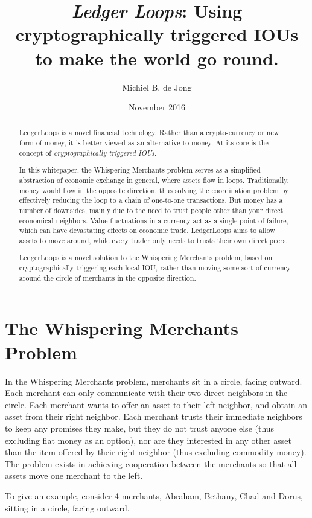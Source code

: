\documentclass[11pt,twoside,a4paper]{article}
\begin{document}
\title{{\em Ledger Loops}: Using cryptographically triggered IOUs to make the world go round.}
\author{Michiel B. de Jong}
\date{November 2016}
\maketitle
\begin{abstract}
LedgerLoops is a novel financial technology. Ra\-ther than a cryp\-to-cur\-ren\-cy or new form of mo\-ney, it is better viewed as an alternative to money. At its core is the concept of {\em cryptographically triggered IOUs}.

In this whitepaper, the Whispering Merchants problem serves as a simplified abstraction of economic exchange in general, where assets flow in loops. Traditionally, money would flow in the opposite direction, thus solving the coordination problem by effectively reducing the loop to a chain of one-to-one transactions. But money has a number of downsides, mainly due to the need to trust people other than your direct economical neighbors. Value fluctuations in a currency act as a single point of failure, which can have devastating effects on economic trade. LedgerLoops aims to allow assets to move around, while every trader only needs to trusts their own direct peers.

LedgerLoops is a novel solution to the Whispering Merchants problem, based on cryptographically triggering each local IOU, ra\-ther than mo\-ving some sort of currency around the circle of merchants in the opposite direction.
\end{abstract}

\section{The Whispering Merchants Problem}
In the Whispering Merchants problem, merchants sit in a circle, facing outward. Each merchant can only communicate with their two direct neighbors in the circle. Each merchant wants to offer an asset to their left neighbor, and obtain an asset from their right neighbor. Each merchant trusts their immediate neighbors to keep any promises they make, but they do not trust anyone else (thus excluding fiat money as an option), nor are they interested in any other asset than the item offered by their right neighbor (thus excluding commodity money). The problem exists in achieving cooperation between the merchants so that all assets move one merchant to the left.

To give an example, consider 4 merchants, Abraham, Bethany, Chad and Dorus, sitting in a circle, facing outward.
\end{document}
